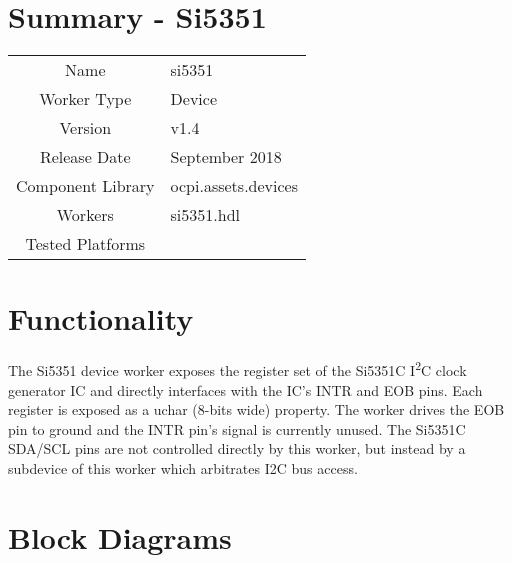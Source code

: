 \documentclass{article}
\author{} %
\date{Version \docVersion} %
\title{\docTitle}
\def\docVersion{1.4}
\def\comp{temp}
\def\comp{si5351}
\def\Comp{TEMP}
\def\Comp{Si5351 }
\begin{document}
\section*{Summary - \Comp}
\begin{tabular}{|c|M{13.5cm}|}
	\hline
	                  &                                                                                \\
	\hline
	Name              & \comp                                                                          \\
	\hline
	Worker Type       & Device                                                                         \\
	\hline
	Version           &  v\docVersion \\
	\hline
	Release Date      &  September 2018 \\
	\hline
	Component Library &  ocpi.assets.devices \\
	\hline
	Workers           &  \comp.hdl \\
	\hline
	Tested Platforms  &  \\
	\hline
\end{tabular}

\section*{Functionality}
\begin{flushleft}
The \Comp{} device worker exposes the register set of the Si5351C I\textsuperscript{2}C clock generator IC\cite{siliconlabsdatasheet} and directly interfaces with the IC's INTR and EOB pins. Each register is exposed as a uchar (8-bits wide) property. The worker drives the EOB pin to ground and the INTR pin's signal is currently unused. The Si5351C SDA/SCL pins are not controlled directly by this worker, but instead by a subdevice of this worker which arbitrates I2C bus access. \\
\end{flushleft}

\section*{Block Diagrams}
\end{document}

